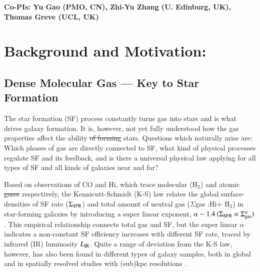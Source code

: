 \documentclass[legal,11pt]{article}
\def\HI{H{\sc i}}
\def\Htwo{H$_2$}
\def\LIR     {$L_{\rm IR}$}
\def\Htwo       {H$_2$}
\providecommand{\DIFaddtex}[1]{{\protect\color{blue}\uwave{#1}}} %
\providecommand{\DIFdeltex}[1]{{\protect\color{red}\sout{#1}}}                      %
\providecommand{\DIFaddbegin}{} %
\providecommand{\DIFaddend}{} %
\providecommand{\DIFdelbegin}{} %
\providecommand{\DIFdelend}{} %
\providecommand{\DIFadd}[1]{\texorpdfstring{\DIFaddtex{#1}}{#1}} %
\providecommand{\DIFdel}[1]{\texorpdfstring{\DIFdeltex{#1}}{}} %
\begin{document}
\begin{table}[htbp]
\begin{threeparttable}[b]
\begin{tabular}{lcclcc}
\hline
\end{tabular}

\begin{tablenotes}
{\bf Co-PIs: Yu Gao (PMO, CN), Zhi-Yu Zhang (U. Edinburg, UK), Thomas Greve (UCL, UK)}\\
\end{tablenotes}
\end{threeparttable}

\end{table}



\clearpage
\justify
\medskip


\section{Background and Motivation:}

\subsection{Dense Molecular Gas --- Key to Star Formation }


The star formation (SF) process constantly turns gas into stars and is what
drives galaxy formation. It is, however, not yet fully understood how the gas
properties affect the ability \DIFdelbegin \DIFdel{of
forming }\DIFdelend \DIFaddbegin \DIFadd{to form }\DIFaddend stars. Questions which naturally arise
are: Which phases of gas are directly connected to SF, what kind of physical
processes regulate SF and its feedback, and is there a universal physical law
applying for all types of SF and all kinds of galaxies near and far?   


Based on observations of CO and \HI, which trace molecular (\Htwo) and atomic
\DIFdelbegin \DIFdel{gases }\DIFdelend \DIFaddbegin \DIFadd{gas }\DIFaddend respectively, the Kennicutt-Schmidt (K-S) law relates the global
surface-densities of SF rate ($\Sigma_{\rm SFR}$) and total amount of neutral
gas ($\Sigma$gas :\HI + \Htwo) in star-forming galaxies by introducing a super
linear exponent, $\alpha \sim 1.4 ~ (\Sigma_{\rm SFR} \propto \Sigma_{\rm
gas}^\alpha)$ \citep{Kennicutt2012}. This empirical relationship connects total
gas and SF, but the super linear $\alpha$ indicates a non-constant SF
efficiency increases with  different SF rate, traced by infrared (IR)
luminosity \LIR. Quite a range of deviation from the K-S law, however, has also
been found in different types of galaxy samples, both in global and in
spatially resolved studies with (sub)kpc resolutions \citep[e.g., see Fig.
\ref{bigiel08}][]{Kennicutt2012,Bigiel2008}.  
\end{document}
